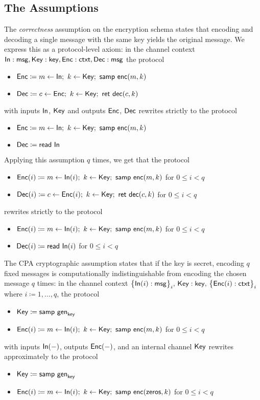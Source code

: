 \subsection{The Assumptions}
The \emph{correctness} assumption on the encryption schema states that encoding and decoding a single message with the same key yields the original message. We express this as a protocol-level axiom: in the channel context $\mathsf{In} : \mathsf{msg}, \mathsf{Key} : \mathsf{key}, \mathsf{Enc} : \mathsf{ctxt}, \mathsf{Dec} : \mathsf{msg}$ the protocol
\begin{itemize}
\item $\mathsf{Enc} \coloneqq m \leftarrow \mathsf{In}; \ k \leftarrow \mathsf{Key}; \ \mathsf{samp} \ \mathsf{enc}(m,k)$
\item $\mathsf{Dec} \coloneqq c \leftarrow \mathsf{Enc}; \ k \leftarrow \mathsf{Key}; \ \mathsf{ret} \ \mathsf{dec}(c,k)$
\end{itemize}
with inputs $\mathsf{In}$, $\mathsf{Key}$ and outputs $\mathsf{Enc}$, $\mathsf{Dec}$ rewrites strictly to the protocol
\begin{itemize}
\item $\mathsf{Enc} \coloneqq m \leftarrow \mathsf{In}; \ k \leftarrow \mathsf{Key}; \ \mathsf{samp} \ \mathsf{enc}(m,k)$
\item $\mathsf{Dec} \coloneqq \mathsf{read} \ \mathsf{In}$
\end{itemize}
Applying this assumption $q$ times, we get that the protocol
\begin{itemize}
\item $\mathsf{Enc}(i) \coloneqq m \leftarrow \mathsf{In}(i); \ k \leftarrow \mathsf{Key}; \ \mathsf{samp} \ \mathsf{enc}(m,k)$ for $0 \leq i < q$
\item $\mathsf{Dec}(i) \coloneqq c \leftarrow \mathsf{Enc}(i); \ k \leftarrow \mathsf{Key}; \ \mathsf{ret} \ \mathsf{dec}(c,k)$ for $0 \leq i < q$
\end{itemize}
rewrites strictly to the protocol
\begin{itemize}
\item $\mathsf{Enc}(i) \coloneqq m \leftarrow \mathsf{In}(i); \ k \leftarrow \mathsf{Key}; \ \mathsf{samp} \ \mathsf{enc}(m,k)$ for $0 \leq i < q$
\item $\mathsf{Dec}(i) \coloneqq \mathsf{read} \ \mathsf{In}(i)$ for $0 \leq i < q$
\end{itemize}
The CPA cryptographic assumption states that if the key is secret, encoding $q$ fixed messages is computationally indistinguishable from encoding the chosen message $q$ times: in the channel context $\big\{\mathsf{In}(i) : \mathsf{msg}\big\}_i, \, \mathsf{Key} : \mathsf{key}, \, \big\{\mathsf{Enc}(i) : \mathsf{ctxt}\big\}_i$ where $i \coloneqq 1,\dots,q$, the protocol
\begin{itemize}
\item $\mathsf{Key} \coloneqq \mathsf{samp} \ \mathsf{gen}_{\mathsf{key}}$
\item $\mathsf{Enc}(i) \coloneqq m \leftarrow \mathsf{In}(i); \ k \leftarrow \mathsf{Key}; \ \mathsf{samp} \ \mathsf{enc}(m,k)$ for $0 \leq i < q$
\end{itemize}
with inputs $\mathsf{In}(-)$, outputs $\mathsf{Enc}(-)$, and an internal channel $\mathsf{Key}$ rewrites approximately to the protocol
\begin{itemize}
\item $\mathsf{Key} \coloneqq \mathsf{samp} \ \mathsf{gen}_{\mathsf{key}}$
\item $\mathsf{Enc}(i) \coloneqq m \leftarrow \mathsf{In}(i); \ k \leftarrow \mathsf{Key}; \ \mathsf{samp} \ \mathsf{enc}{(\mathsf{zeros},k)}$ for $0 \leq i < q$
\end{itemize}

